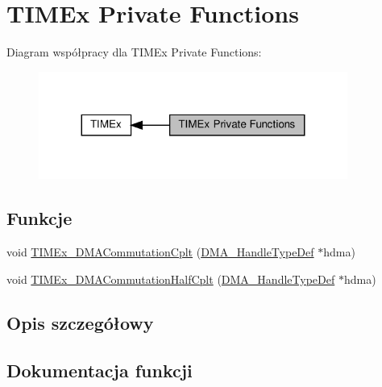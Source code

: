 \hypertarget{group___t_i_m_ex___private___functions}{}\section{T\+I\+M\+Ex Private Functions}
\label{group___t_i_m_ex___private___functions}
Diagram współpracy dla T\+I\+M\+Ex Private Functions\+:\nopagebreak
\begin{figure}[H]
\begin{center}
\leavevmode
\includegraphics[width=287pt]{group___t_i_m_ex___private___functions}
\end{center}
\end{figure}
\subsection*{Funkcje}
\begin{DoxyCompactItemize}
\item 
void \hyperlink{group___t_i_m_ex___private___functions_gaf473fa38254d62a74a006a781fe0aeb8}{T\+I\+M\+Ex\+\_\+\+D\+M\+A\+Commutation\+Cplt} (\hyperlink{group___d_m_a___exported___types_ga41b754a906b86bce54dc79938970138b}{D\+M\+A\+\_\+\+Handle\+Type\+Def} $\ast$hdma)
\item 
void \hyperlink{group___t_i_m_ex___private___functions_ga65b7244a1ee94cf20081543377ba8d2a}{T\+I\+M\+Ex\+\_\+\+D\+M\+A\+Commutation\+Half\+Cplt} (\hyperlink{group___d_m_a___exported___types_ga41b754a906b86bce54dc79938970138b}{D\+M\+A\+\_\+\+Handle\+Type\+Def} $\ast$hdma)
\end{DoxyCompactItemize}


\subsection{Opis szczegółowy}


\subsection{Dokumentacja funkcji}
\mbox{\label{group___t_i_m_ex___private___functions_gaf473fa38254d62a74a006a781fe0aeb8}} 
